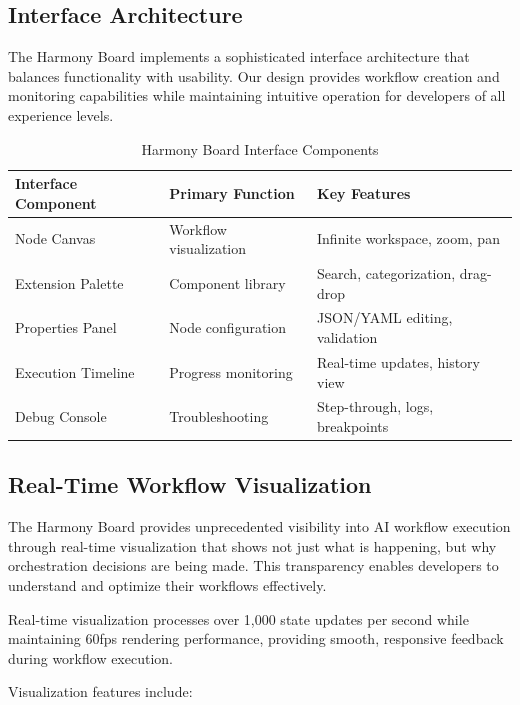 \subsection*{Interface Architecture}

The Harmony Board implements a sophisticated interface architecture that balances functionality with usability. Our design provides workflow creation and monitoring capabilities while maintaining intuitive operation for developers of all experience levels.

\begin{table}[ht]
\centering
\begin{tabular}{@{}lll@{}}
\toprule
\textbf{Interface Component} & \textbf{Primary Function} & \textbf{Key Features} \\
\midrule
Node Canvas & Workflow visualization & Infinite workspace, zoom, pan \\
Extension Palette & Component library & Search, categorization, drag-drop \\
Properties Panel & Node configuration & JSON/YAML editing, validation \\
Execution Timeline & Progress monitoring & Real-time updates, history view \\
Debug Console & Troubleshooting & Step-through, logs, breakpoints \\
\bottomrule
\end{tabular}
\caption{Harmony Board Interface Components}
\end{table}

\subsection*{Real-Time Workflow Visualization}

The Harmony Board provides unprecedented visibility into AI workflow execution through real-time visualization that shows not just what is happening, but why orchestration decisions are being made. This transparency enables developers to understand and optimize their workflows effectively.

\begin{alertbox}
Real-time visualization processes over 1,000 state updates per second while maintaining 60fps rendering performance, providing smooth, responsive feedback during workflow execution.
\end{alertbox}

Visualization features include:

